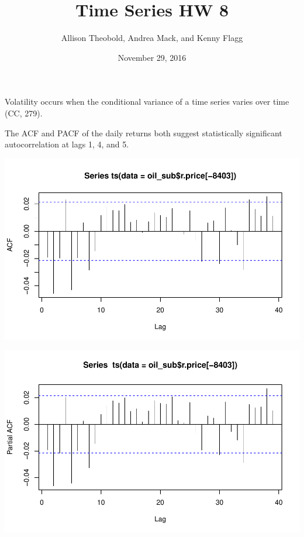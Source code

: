 \documentclass[11pt]{article}\usepackage[]{graphicx}\usepackage[]{color}
\title{Time Series HW 8}
\author{Allison Theobold, Andrea Mack, and Kenny Flagg}
\date{November 29, 2016}
\makeatletter
\def\maxwidth{ %
  \ifdim\Gin@nat@width>\linewidth
    \linewidth
  \else
    \Gin@nat@width
  \fi
}
\newenvironment{knitrout}{}{} %
\makeatother
\begin{document}
\maketitle




Volatility occurs when the conditional variance of a time series varies over time (CC, 279).



The ACF and PACF of the daily returns both suggest statistically significant autocorrelation at lags 1, 4, and 5. 

\begin{knitrout}\footnotesize
{}\color{fgcolor}

{\centering \includegraphics[width=\maxwidth]{figure/assess_autocorr-1} 

}




{\centering \includegraphics[width=\maxwidth]{figure/assess_autocorr-2} 

}
\end{knitrout}
\end{document}
